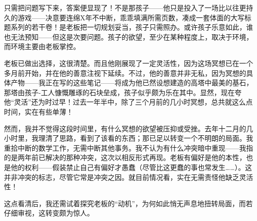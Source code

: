 只需把问题写下来，答案便显现了！不是那孩子——他只是投入了一场比以往更持久的游戏——决意要连绵X年不中断，乖乖填满所需页数，凑成一套体面的大写标题系列的若干卷！是老板把一切规划妥当，孩子只需照办。或许孩子乐意如此，谁也无法预知——但这是次要问题。孩子的欲望，至少在某种程度上，取决于环境，而环境主要由老板掌控。

老板已做出选择，这很清楚。而且他刚展现了一定灵活性，因为这场冥想已在一个多月前开始，并在他的善意注视下延续。不过，他的善意并非无私，因为冥想的具体产物——我正在写的这些笔记——将成为他已然设想建造的高塔中最美的基石，那塔由孩子-工人慷慨雕琢的石块垒成，孩子似乎颇为乐在其中。显然，现在夸他“灵活”还为时过早！过去一年半中，除了三个月前的几小时冥想，总共就这么点时间，实在有些单薄！

然而，我并不觉得这段时间里，有什么冥想的欲望被压抑或受挫。去年十二月的几小时里，我理清了思路，看到了该看的东西；那已足以转变一个不明朗的局面。我重拾中断的数学工作，无需中断其他事务。我不认为有什么冲突暗中重现——我指的是两年前已解决的那种冲突，这次以相反形式再现。老板有偏好是他的本性，也是他的权利——假装禁止自己有偏好才愚蠢（尽管比这更蠢的事也常发生……）。这并非冲突的标志，尽管它常是冲突之因。就目前情况看，实在无需责怪他缺乏灵活性！

这点看清后，我还需试着探究老板的“动机”，为何如此悄无声息地扭转局面，而若仔细审视，这转变颇为惊人。
